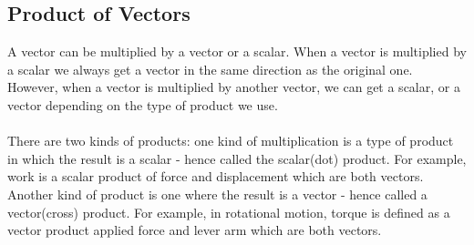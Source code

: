 \documentclass[9pt]{exam}
\begin{document}
\subsection*{Product of Vectors}
A vector can be multiplied by a vector or a scalar. When a vector is multiplied by a scalar we always get a vector in the same direction as the original one. However, when a vector is multiplied by another vector, we can get a scalar, or a vector depending on the type of product we use. \\ \\
There are two kinds of products: one kind of multiplication is a type of product in which the result is a scalar - hence called the scalar(dot) product. For example, work is a scalar product of force and displacement which are both vectors. Another kind of product is one where the result is a vector - hence called a vector(cross) product. For example, in rotational motion, torque is defined as a vector product applied force and lever arm which are both vectors. 
\end{document}
